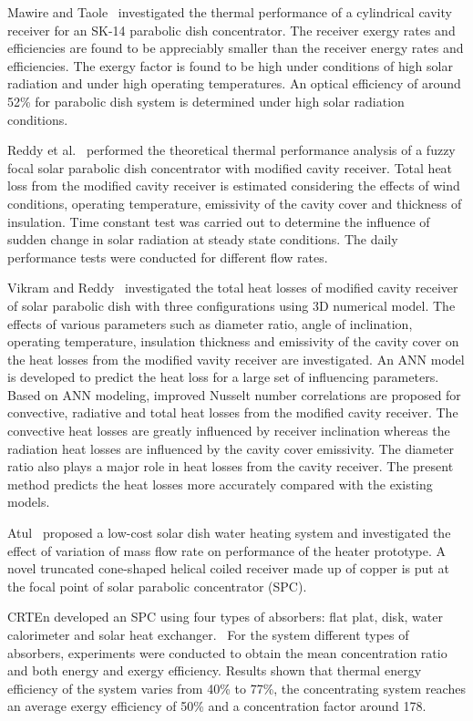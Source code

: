 Mawire and Taole~\cite{Mawire2014} investigated the thermal performance of a cylindrical cavity receiver for an SK-14 parabolic dish concentrator. The receiver exergy rates and efficiencies are found to be appreciably smaller than the receiver energy rates and efficiencies. The exergy factor is found to be high under conditions of high solar radiation and under high operating temperatures. An optical efficiency of around 52\% for parabolic dish system is determined under high solar radiation conditions.

Reddy et al.~\cite{Reddy2015,Reddy2015_2} performed the theoretical thermal performance analysis of a fuzzy focal solar parabolic dish concentrator with modified cavity receiver. Total heat loss from the modified cavity receiver is estimated considering the effects of wind conditions, operating temperature, emissivity of the cavity cover and thickness of insulation. Time constant test was carried out to determine the influence of sudden change in solar radiation at steady state conditions. The daily performance tests were conducted for different flow rates.

Vikram and Reddy~\cite{Vikram2015} investigated the total heat losses of modified cavity receiver of solar parabolic dish with three configurations using 3D numerical model. The effects of various parameters such as diameter ratio, angle of inclination, operating temperature, insulation thickness and emissivity of the cavity cover on the heat losses from the modified vavity receiver are investigated. An ANN model is developed to predict the heat loss for a large set of influencing parameters. Based on ANN modeling, improved Nusselt number correlations are proposed for convective, radiative and total heat losses from the modified cavity receiver. The convective heat losses are greatly influenced by receiver inclination whereas the radiation heat losses are influenced by the cavity cover emissivity. The diameter ratio also plays a major role in heat losses from the cavity receiver. The present method predicts the heat losses more accurately compared with the existing models.

Atul~\cite{Atul2015} proposed a low-cost solar dish water heating system and investigated the effect of variation of mass flow rate on performance of the heater prototype. A novel truncated cone-shaped helical coiled receiver made up of copper is put at the focal point of solar parabolic concentrator (SPC).

CRTEn developed an SPC using four types of absorbers: flat plat, disk, water calorimeter and solar heat exchanger.~\cite{Skouri2013} For the system different types of absorbers, experiments were conducted to obtain the mean concentration ratio and both energy and exergy efficiency. Results shown that thermal energy efficiency of the system varies from 40\% to 77\%, the concentrating system reaches an average exergy efficiency of 50\% and a concentration factor around 178.

